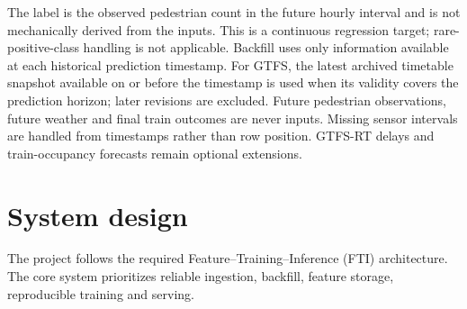 \documentclass[10pt,a4paper]{article}
\begin{document}
The label is the observed pedestrian count in the future hourly interval and is not mechanically derived from the inputs. This is a continuous regression target; rare-positive-class handling is not applicable. Backfill uses only information available at each historical prediction timestamp. For GTFS, the latest archived timetable snapshot available on or before the timestamp is used when its validity covers the prediction horizon; later revisions are excluded. Future pedestrian observations, future weather and final train outcomes are never inputs. Missing sensor intervals are handled from timestamps rather than row position. GTFS-RT delays and train-occupancy forecasts remain optional extensions.

\section{System design}
The project follows the required Feature--Training--Inference (FTI) architecture. The core system prioritizes reliable ingestion, backfill, feature storage, reproducible training and serving.

\begin{center}
\end{center}
\end{document}
